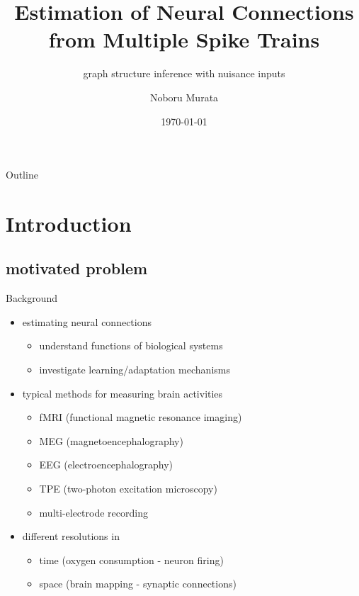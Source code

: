 \documentclass[fleqn,aspectratio=1610]{beamer}
\author{Noboru Murata}
\date{\today}
\title{Estimation of Neural Connections from Multiple Spike Trains}
\subtitle{graph structure inference with nuisance inputs}
\institute{\url{https://noboru-murata.github.io/}}
\begin{document}
\maketitle
\begin{frame}{Outline}
\tableofcontents
\end{frame}


\section{Introduction}
\label{sec:org648f585}
\subsection{motivated problem}
\label{sec:org1c6d786}
\begin{frame}[label={sec:org0231462}]{Background}
\begin{itemize}
\item estimating neural connections

\begin{itemize}
\item understand functions of biological systems
\item investigate learning/adaptation mechanisms
\end{itemize}
\end{itemize}

\smallskip
\begin{itemize}
\item typical methods for measuring brain activities

\begin{itemize}
\item fMRI
(functional magnetic resonance imaging)
\item MEG
(magnetoencephalography)
\item EEG
(electroencephalography)
\item TPE
(two-photon excitation microscopy)
\item \alert{multi-electrode recording}
\end{itemize}
\end{itemize}

\smallskip
\begin{itemize}
\item different resolutions in
\begin{itemize}
\item time (oxygen consumption - neuron firing)
\item space (brain mapping - synaptic connections)
\end{itemize}
\end{itemize}
\end{frame}
\end{document}
